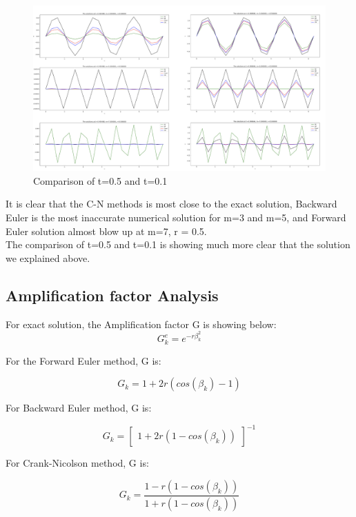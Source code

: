 \documentclass[12pt]{article}
\begin{document}
\begin{figure}[H] 
\centering 
\includegraphics[scale=0.25]{figures for different methods.jpg} 
\caption{Comparison of t=0.5 and t=0.1} 
\label{TDMA Solver code} 
\end{figure}


It is clear that the C-N methods is most close to the exact solution, Backward Euler is the most inaccurate numerical solution for m=3 and m=5, and Forward Euler solution almost blow up at m=7, r = 0.5.\\

The comparison of t=0.5 and t=0.1 is showing much more clear that the solution we explained above.



\subsection{Amplification factor Analysis}


For exact solution, the Amplification factor G is showing below:
$$G^{e}_{k}=e^{-r\beta^{2}_{k} }$$

For the Forward Euler method, G is:

$$G_{k}=1+2r\left( cos\left( \beta_{k} \right)  -1\right)  $$

For Backward Euler method, G is:

$$G_{k}=\begin{bmatrix}1+2r\left( 1-cos\left( \beta_{k} \right)  \right)  \end{bmatrix}^{-1} $$



For Crank-Nicolson method, G is:

$$G_{k}=\frac{1-r\left( 1-cos\left( \beta_{k} \right)  \right)  }{1+r\left( 1-cos\left( \beta_{k} \right)  \right)  } $$
\end{document}
